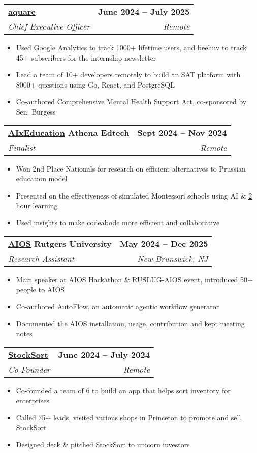 \documentclass[letterpaper,11pt]{article}
\makeatletter
\newcommand{\resumeItem}[1]{
  \item\small{
    {#1 \vspace{-2pt}}
  }
}
\newcommand{\resumeSubheading}[4]{
  \vspace{-2pt}\item
   \begin{tabular*}{1.0\textwidth}[t]{l@{\extracolsep{\fill}}r}
      \textbf{#1} & \textbf{\small #2} \\
      \textit{\small#3} & \textit{\small #4} \\
    \end{tabular*}\vspace{-7pt}
}
\newcommand{\resumeItemListStart}{\begin{itemize}}
\newcommand{\resumeItemListEnd}{\end{itemize}\vspace{-5pt}}
\makeatother
\begin{document}
    \resumeSubheading
      {\href{https://aquarc.org}{\underline{aquarc}}}{June 2024 -- July 2025}
      {Chief Executive Officer}{Remote}
      \resumeItemListStart
        \resumeItem{Used Google Analytics to track 1000+ lifetime users, and beehiiv to track 45+ subscribers for the internship newsletter}
        \resumeItem{Lead a team of 10+ developers remotely to build an SAT platform with 8000+ questions using Go, React, and PostgreSQL}
        \resumeItem{Co-authored Comprehensive Mental Health Support Act, co-sponsored by Sen. Burgess}
    \resumeItemListEnd

   \resumeSubheading
     {\href{https://hbsp.harvard.edu/inspiring-minds/how-students-are-actually-using-generative-ai}{\underline{AIxEducation}} Athena Edtech}{Sept 2024 -- Nov 2024}
     {Finalist}{Remote}
     \resumeItemListStart
     \resumeItem{Won 2nd Place Nationals for research on efficient alternatives to Prussian education model}
     \resumeItem{Presented on the effectiveness of simulated Montessori schools using AI \& \href{https://2hourlearning.com/}{\underline{2 hour learning}}}
     \resumeItem{Used insights to make codeabode more efficient and collaborative}
   \resumeItemListEnd

   \resumeSubheading
     {\href{https://github.com/agiresearch/AIOS}{\underline{AIOS}} Rutgers University}{May 2024 -- Dec 2025}
     {Research Assistant}{New Brunswick, NJ}
     \resumeItemListStart
     \resumeItem{Main speaker at AIOS Hackathon \& RUSLUG-AIOS event, introduced 50+ people to AIOS}
     \resumeItem{Co-authored AutoFlow, an automatic agentic workflow generator}
     \resumeItem{Documented the AIOS installation, usage, contribution and kept meeting notes}
   \resumeItemListEnd

    \resumeSubheading
      {\href{https://web.archive.org/web/20250119183417if_/https://stocksort.net/}{\underline{StockSort}}}{June 2024 -- July 2024}
      {Co-Founder}{Remote}
      \resumeItemListStart
        \resumeItem{Co-founded a team of 6 to build an app that helps sort inventory for enterprises}
        \resumeItem{Called 75+ leads, visited various shops in Princeton to promote and sell StockSort}
        \resumeItem{Designed deck \& pitched StockSort to unicorn investors}
      \resumeItemListEnd

    

\end{document}
